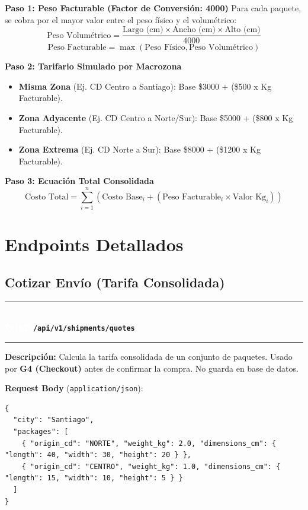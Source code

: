 \documentclass[11pt, a4paper]{article}
\newcommand{\httpmethod}[2]{%
  \colorbox{#1}{\textcolor{white}{\textbf{\small\textsf{#2}}}}%
}
\newcommand{\routeheader}[3]{%
  \noindent\rule{\textwidth}{1.5pt}\\[0.3em]
  \httpmethod{#1}{#2}\;\texttt{\bfseries #3}\\[0.3em]
  \rule{\textwidth}{0.4pt}
  \vspace{0.3cm}
}
\begin{document}
\textbf{Paso 1: Peso Facturable (Factor de Conversión: 4000)}
Para cada paquete, se cobra por el mayor valor entre el peso físico y el volumétrico:
$$ \text{Peso Volumétrico} = \frac{\text{Largo (cm)} \times \text{Ancho (cm)} \times \text{Alto (cm)}}{4000} $$
$$ \text{Peso Facturable} = \max(\text{Peso Físico}, \text{Peso Volumétrico}) $$

\textbf{Paso 2: Tarifario Simulado por Macrozona}
\begin{itemize}[noitemsep]
  \item \textbf{Misma Zona} (Ej. CD Centro a Santiago): Base \$3000 + (\$500 x Kg Facturable).
  \item \textbf{Zona Adyacente} (Ej. CD Centro a Norte/Sur): Base \$5000 + (\$800 x Kg Facturable).
  \item \textbf{Zona Extrema} (Ej. CD Norte a Sur): Base \$8000 + (\$1200 x Kg Facturable).
\end{itemize}

\textbf{Paso 3: Ecuación Total Consolidada}
$$ \text{Costo Total} = \sum_{i=1}^{n} \left( \text{Costo Base}_i + (\text{Peso Facturable}_i \times \text{Valor Kg}_i) \right) $$

\section{Endpoints Detallados}

\subsection{Cotizar Envío (Tarifa Consolidada)}

\routeheader{post}{POST}{/api/v1/shipments/quotes}

\textbf{Descripción:} Calcula la tarifa consolidada de un conjunto de paquetes. Usado por \textbf{G4 (Checkout)} antes de confirmar la compra. No guarda en base de datos.

\vspace{0.3cm}
\textbf{Request Body} (\texttt{application/json}):

\begin{lstlisting}
{
  "city": "Santiago",
  "packages": [
    { "origin_cd": "NORTE", "weight_kg": 2.0, "dimensions_cm": { "length": 40, "width": 30, "height": 20 } },
    { "origin_cd": "CENTRO", "weight_kg": 1.0, "dimensions_cm": { "length": 15, "width": 10, "height": 5 } }
  ]
}
\end{lstlisting}
\end{document}
